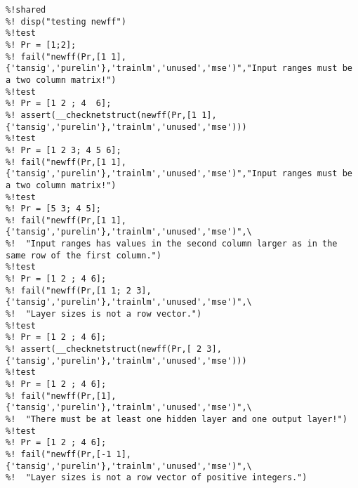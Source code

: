 \begin{verbatim}
%!shared
%! disp("testing newff")
%!test
%! Pr = [1;2];
%! fail("newff(Pr,[1 1],{'tansig','purelin'},'trainlm','unused','mse')","Input ranges must be a two column matrix!")
%!test
%! Pr = [1 2 ; 4  6];
%! assert(__checknetstruct(newff(Pr,[1 1],{'tansig','purelin'},'trainlm','unused','mse')))
%!test
%! Pr = [1 2 3; 4 5 6];
%! fail("newff(Pr,[1 1],{'tansig','purelin'},'trainlm','unused','mse')","Input ranges must be a two column matrix!")
%!test
%! Pr = [5 3; 4 5];
%! fail("newff(Pr,[1 1],{'tansig','purelin'},'trainlm','unused','mse')",\
%!  "Input ranges has values in the second column larger as in the same row of the first column.")
%!test
%! Pr = [1 2 ; 4 6];
%! fail("newff(Pr,[1 1; 2 3],{'tansig','purelin'},'trainlm','unused','mse')",\
%!  "Layer sizes is not a row vector.")
%!test
%! Pr = [1 2 ; 4 6];
%! assert(__checknetstruct(newff(Pr,[ 2 3],{'tansig','purelin'},'trainlm','unused','mse')))
%!test
%! Pr = [1 2 ; 4 6];
%! fail("newff(Pr,[1],{'tansig','purelin'},'trainlm','unused','mse')",\
%!  "There must be at least one hidden layer and one output layer!")
%!test
%! Pr = [1 2 ; 4 6];
%! fail("newff(Pr,[-1 1],{'tansig','purelin'},'trainlm','unused','mse')",\
%!  "Layer sizes is not a row vector of positive integers.")
\end{verbatim}
